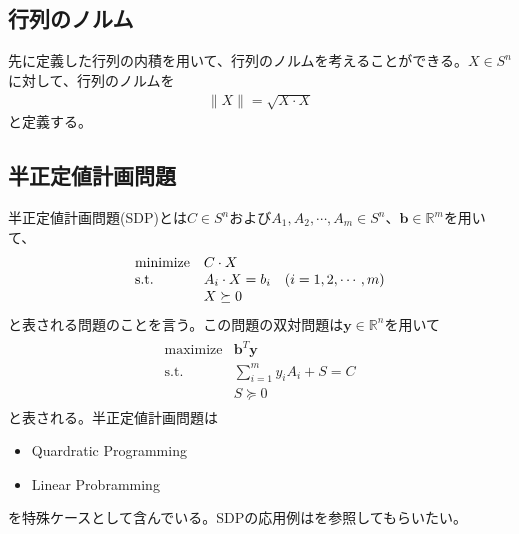 \subsection{行列のノルム}
先に定義した行列の内積を用いて、行列のノルムを考えることができる。$X \in S^n$に対して、行列のノルムを
\begin{align*}
  \|X\| = \sqrt{X \cdot X}
\end{align*}
と定義する。

\subsection{半正定値計画問題}
半正定値計画問題(SDP)とは$C \in S^n$および$A_1, A_2, \cdots, A_m \in S^n$、$\mathbf{b} \in \mathbb{R}^m$を用いて、
\begin{align} \label{MainProblem}
  \begin{array}{lll}
    \mathrm{minimize} & C \cdot X \\
    \mathrm{s.t.}     & A_i \cdot X = b_i & \parenthesis(i = 1, 2, \cdots, m) \\
                      & X \succeq 0
  \end{array}
\end{align}
と表される問題のことを言う。この問題の双対問題は$\mathbf{y} \in \mathbb{R}^n$を用いて
\begin{align} \label{DualProblem}
  \begin{array}{lll}
    \mathrm{maximize} & \mathbf{b}^T \mathbf{y} \\
    \mathrm{s.t.}     & \displaystyle{\sum_{i = 1}^m} y_i A_i + S = C \\
                      & S \succeq 0
  \end{array}
\end{align}
と表される。半正定値計画問題は
\begin{itemize}
  \item Quardratic Programming
  \item Linear Probramming
\end{itemize}
を特殊ケースとして含んでいる。SDPの応用例は\cite{Applications}を参照してもらいたい。


